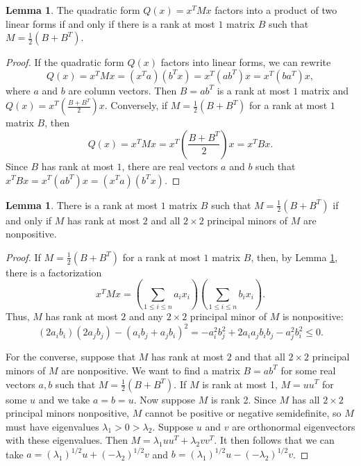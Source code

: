 \documentclass{amsart}
\theoremstyle{definition}
\newtheorem{lemma}[theorem]{Lemma}
\theoremstyle{remark}
\begin{document}
\begin{lemma}\label{lem:quadr1} 
The quadratic form $Q(x)=x^{T}Mx$ factors into a product of two linear forms if and only if there is a rank at most $1$ matrix $B$  such that $M=\frac{1}{2}(B+B^{T})$.    
\end{lemma}
\begin{proof}
If the quadratic form $Q(x)$ factors into linear forms, we can rewrite
\[
Q(x)=x^{T}Mx=(x^{T}a)(b^{T}x)=x^{T}(ab^{T})x=x^T(ba^T)x,
\]
where $a$ and $b$ are column vectors. Then  $B=ab^{T}$ is a rank at most $1$ matrix and $Q(x)=x^{T}\left(\frac{B+B^{T}}{2}\right)x$.
Conversely, if $M=\frac{1}{2}(B+B^{T})$ for a rank at most $1$ matrix $B$, then 
\[Q(x)=x^{T}Mx=x^{T}\left(\frac{B+B^{T}}{2}\right)x=x^{T}Bx.\]
Since $B$ has rank at most $1$, there are real vectors $a$ and $b$ such that
$x^{T}Bx=x^{T}(ab^{T})x=(x^{T}a)(b^{T}x)$. 
\end{proof}

\begin{lemma}\label{lem:rank2} 
 There is a rank at most $1$ matrix $B$ such that $M=\frac{1}{2}(B+B^{T})$ if and only if $M$ has rank at most $2$ and all $2\times2$ principal minors of $M$ are nonpositive.
\end{lemma}
\begin{proof}
If  $M=\frac{1}{2}(B+B^{T})$ for a rank at most $1$ matrix $B$, then, by Lemma \ref{lem:quadr1}, there is a factorization 
\[
x^{T}Mx=\left(\sum_{1\leq i\leq n}a_ix_i\right)\left(\sum_{1\leq i\leq n}b_ix_i\right).
\]
Thus, $M$ has rank at most $2$ and any $2 \times 2$ principal minor of $M$ is nonpositive:
\[(2a_ib_i)(2a_jb_j)-(a_ib_j+a_jb_i)^2=-a_i^2b_j^2+2a_ia_jb_ib_j-a_j^2b_i^2 \leq 0.\]

For the converse, suppose that $M$ has rank at most $2$ and that all $2\times2$ principal minors of $M$ are nonpositive. We want to find a matrix $B=ab^T$ 
for some real vectors $a,b$ such that $M=\frac{1}{2}(B+B^{T})$. If $M$ is rank at most 1, $M=uu^T$ for some $u$ and we take $a=b=u$. Now suppose $M$ is rank 2. 
Since $M$ has all $2\times 2$ principal minors nonpositive, $M$ cannot be positive or negative semidefinite, so $M$ must have eigenvalues $\lambda_1>0>\lambda_2$. 
Suppose $u$ and $v$ are orthonormal eigenvectors with these eigenvalues. Then $M=\lambda_1 uu^T+\lambda_2vv^T$. 
It then follows that we can take $a=(\lambda_1)^{1/2}u+(-\lambda_2)^{1/2}v$ and $b= (\lambda_1)^{1/2}u-(-\lambda_2)^{1/2}v$.
\end{proof}
\end{document}
